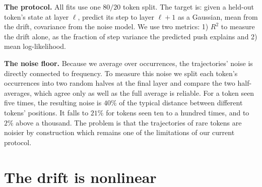 \documentclass[mlmain]{jmlr}
\begin{document}
\textbf{The protocol.} All fits use one $80/20$ token split. 
The target is: given a held-out token's state at layer $\ell$, predict its step to layer
$\ell + 1$ as a Gaussian, mean from the drift, covariance from the
noise model. We use two metrics: 1) $R^2$ to measure
the drift alone, as the fraction of step variance the predicted push
explains and 2) mean log-likelihood.

\textbf{The noise floor.} Because we average over occurrences, the trajectories' noise is directly connected to frequency.
To measure this noise we split each token's occurrences into two random halves at the final layer and compare the two half-averages, 
which agree only as well as the full average is reliable. For a token seen five times, the resulting noise is $40\%$ of the typical 
distance between different tokens' positions. It falls to $21\%$ for tokens seen ten to a hundred times, and to $2\%$ above a thousand.
The problem is that the trajectories of rare tokens are noisier by construction which remains one of the limitations of our current protocol. 




\section{The drift is nonlinear}
\label{sec:nonlinear}
\end{document}
